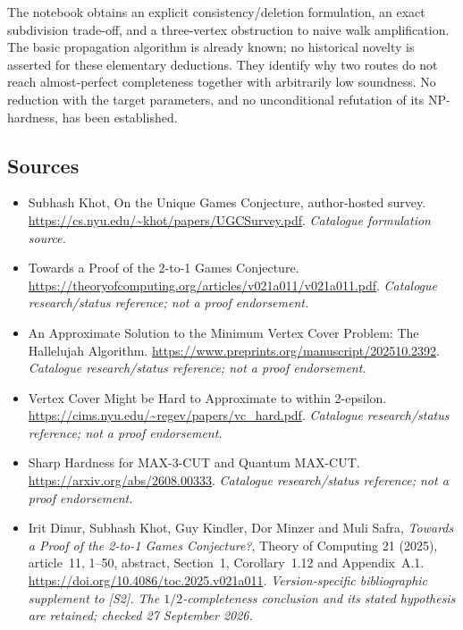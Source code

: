 \documentclass[11pt,a4paper]{article}
\numberwithin{equation}{section}
\begin{document}
The notebook obtains an explicit consistency/deletion formulation, an
exact subdivision trade-off, and a three-vertex obstruction to naive walk
amplification. The basic propagation algorithm is already known; no
historical novelty is asserted for these elementary deductions. They
identify why two routes do not reach almost-perfect completeness together
with arbitrarily low soundness. No reduction with the target parameters,
and no unconditional refutation of its NP-hardness, has been established.


\subsection{Sources}
\begin{itemize}\raggedright
\item[\textnormal{[S1]}]\hypertarget{source:29:1}{} Subhash Khot, On the Unique Games Conjecture, author-hosted survey.
\url{https://cs.nyu.edu/~khot/papers/UGCSurvey.pdf}.
{\small\textit{Catalogue formulation source.}}
\item[\textnormal{[S2]}]\hypertarget{source:29:2}{} Towards a Proof of the 2-to-1 Games Conjecture.
\url{https://theoryofcomputing.org/articles/v021a011/v021a011.pdf}.
{\small\textit{Catalogue research/status reference; not a proof endorsement.}}
\item[\textnormal{[S3]}]\hypertarget{source:29:3}{} An Approximate Solution to the Minimum Vertex Cover Problem: The Hallelujah Algorithm.
\url{https://www.preprints.org/manuscript/202510.2392}.
{\small\textit{Catalogue research/status reference; not a proof endorsement.}}
\item[\textnormal{[S4]}]\hypertarget{source:29:4}{} Vertex Cover Might be Hard to Approximate to within 2-epsilon.
\url{https://cims.nyu.edu/~regev/papers/vc_hard.pdf}.
{\small\textit{Catalogue research/status reference; not a proof endorsement.}}
\item[\textnormal{[S5]}]\hypertarget{source:29:5}{} Sharp Hardness for MAX-3-CUT and Quantum MAX-CUT.
\url{https://arxiv.org/abs/2608.00333}.
{\small\textit{Catalogue research/status reference; not a proof endorsement.}}
\item[\textnormal{[E1]}]\hypertarget{extra:29:1}{} Irit Dinur, Subhash Khot,
Guy Kindler, Dor Minzer and Muli Safra, \emph{Towards a Proof of the
2-to-1 Games Conjecture?}, Theory of Computing 21 (2025), article~11,
1--50, abstract, Section~1, Corollary~1.12 and Appendix~A.1.
\url{https://doi.org/10.4086/toc.2025.v021a011}.
{\small\textit{Version-specific bibliographic supplement to [S2]. The
$1/2$-completeness conclusion and its stated hypothesis are retained;
checked 27 September 2026.}}

\end{itemize}

\end{document}
